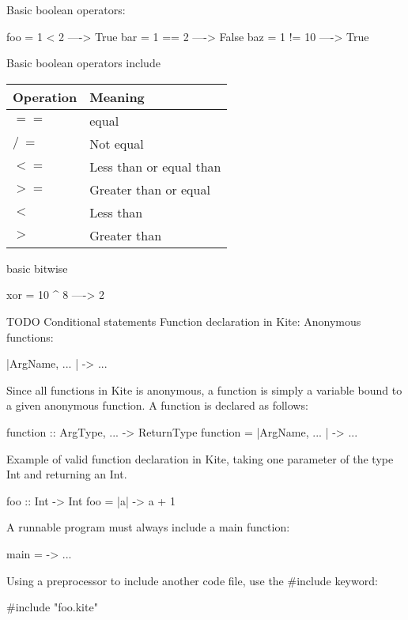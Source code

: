 Basic boolean operators:
\begin{kite}
  
  foo = 1 < 2  ----> True
  bar = 1 == 2 ----> False
  baz = 1 != 10 ----> True
\end{kite}
Basic boolean operators include 
\begin{table}[H]
\centering
    \begin{tabular}{|l|l|}
    \hline
    Operation & Meaning                 \\ \hline
    $==$        & equal                   \\ \hline
    $/\ =$        & Not equal               \\ \hline
    $<=$        & Less than or equal than \\ \hline
    $>=$        & Greater than or equal   \\ \hline
    $<$         & Less than               \\ \hline
    $>$         & Greater than            \\ \hline
    \end{tabular}
\end{table}

basic bitwise
\begin{kite}
  
  xor = 10 ^ 8 ----> 2
\end{kite}

TODO Conditional statements 
Function declaration in Kite:
Anonymous functions:

\begin{kite}
  
|ArgName, ... | -> { ... }
\end{kite}
Since all functions in Kite is anonymous, a function is simply a
variable bound to a given anonymous function. A function is declared
as follows:
\begin{kite}
  
  function :: ArgType, ... -> ReturnType
  function = |ArgName, ... | -> { ... }
\end{kite}
Example of valid function declaration in Kite, taking one parameter of
the type Int and returning an Int.
\begin{kite}
  
  foo :: Int -> Int
  foo = |a| -> {
    a + 1
  }
\end{kite}
A runnable program must always include a main function:
\begin{kite}
  
  main = -> { ... }
\end{kite}
Using a preprocessor to include another code file, use the \#include
keyword:
\begin{kite}
  
  #include "foo.kite"
\end{kite}

